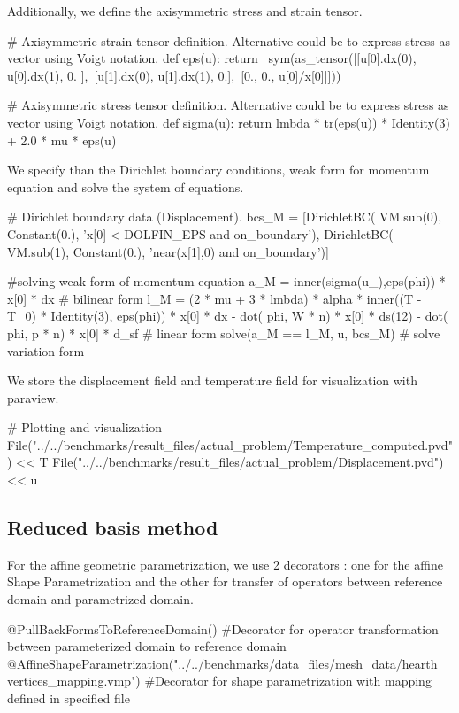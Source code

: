 Additionally, we define the axisymmetric stress and strain tensor.
\begin{python}
# Axisymmetric strain tensor definition. Alternative could be to express stress as vector using Voigt notation.
def eps(u):
	return \
		sym(as_tensor([[u[0].dx(0), u[0].dx(1), 0. ],\
		[u[1].dx(0), u[1].dx(1), 0.],\
		[0., 0., u[0]/x[0]]]))

# Axisymmetric stress tensor definition. Alternative could be to express stress as vector using Voigt notation.
def sigma(u):
	return lmbda * tr(eps(u)) * Identity(3) + 2.0 * mu * eps(u)
\end{python}

We specify than the Dirichlet boundary conditions, weak form for momentum equation and solve the system of equations.
\begin{python}
# Dirichlet boundary data (Displacement).
bcs_M = [DirichletBC( VM.sub(0), Constant(0.), 'x[0] < DOLFIN_EPS and on_boundary'), DirichletBC( VM.sub(1), Constant(0.), 'near(x[1],0) and on_boundary')] 

#solving weak form of momentum equation
a_M = inner(sigma(u_),eps(phi)) * x[0] * dx # bilinear form
l_M = (2 * mu + 3 * lmbda) * alpha * inner((T - T_0) * Identity(3), eps(phi)) * x[0] * dx - dot( phi, W * n) * x[0] * ds(12) - dot( phi, p * n) * x[0] * d_sf # linear form
solve(a_M == l_M, u, bcs_M) # solve variation form
\end{python}

We store the displacement field and temperature field for visualization with paraview.
\begin{python}
# Plotting and visualization
File("../../benchmarks/result_files/actual_problem/Temperature_computed.pvd") << T
File("../../benchmarks/result_files/actual_problem/Displacement.pvd") << u
\end{python}

\subsection{Reduced basis method}

For the affine geometric parametrization, we use 2 decorators : one for the affine Shape Parametrization and the other for transfer of operators between reference domain and parametrized domain.
\begin{python}
@PullBackFormsToReferenceDomain() #Decorator for operator transformation between parameterized domain to reference domain
@AffineShapeParametrization("../../benchmarks/data_files/mesh_data/hearth_vertices_mapping.vmp") #Decorator for shape parametrization with mapping defined in specified file
\end{python}

